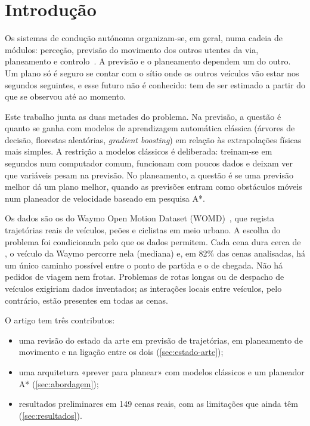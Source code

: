 \section{Introdução}
\label{sec:introducao}

Os sistemas de condução autónoma organizam-se, em geral, numa cadeia de
módulos: perceção, previsão do movimento dos outros utentes da via,
planeamento e controlo~\cite{paden2016survey,schwarting2018planning}. A
previsão e o planeamento dependem um do outro. Um plano só é seguro se
contar com o sítio onde os outros veículos vão estar nos segundos
seguintes, e esse futuro não é conhecido: tem de ser estimado a partir do
que se observou até ao momento.

Este trabalho junta as duas metades do problema. Na previsão, a questão é
quanto se ganha com modelos de aprendizagem automática clássica (árvores
de decisão, florestas aleatórias, \emph{gradient boosting}) em relação às
extrapolações físicas mais simples. A restrição a modelos clássicos é
deliberada: treinam-se em segundos num computador comum, funcionam com
poucos dados e deixam ver que variáveis pesam na previsão. No
planeamento, a questão é se uma previsão melhor dá um plano melhor,
quando as previsões entram como obstáculos móveis num planeador de
velocidade baseado em pesquisa A*.

Os dados são os do Waymo Open Motion Dataset
(WOMD)~\cite{ettinger2021large}, que regista trajetórias reais de
veículos, peões e ciclistas em meio urbano. A escolha do problema foi
condicionada pelo que os dados permitem. Cada cena dura cerca de
, o veículo da Waymo percorre nela  (mediana) e, em
82\% das cenas analisadas, há um único caminho possível entre o ponto de
partida e o de chegada. Não há pedidos de viagem nem frotas. Problemas de
rotas longas ou de despacho de veículos exigiriam dados inventados; as
interações locais entre veículos, pelo contrário, estão presentes em
todas as cenas.

O artigo tem três contributos:
\begin{itemize}
  \item uma revisão do estado da arte em previsão de trajetórias, em
    planeamento de movimento e na ligação entre os dois
    (\cref{sec:estado-arte});
  \item uma arquitetura «prever para planear» com modelos clássicos e um
    planeador A* (\cref{sec:abordagem});
  \item resultados preliminares em 149 cenas reais, com as limitações que
    ainda têm (\cref{sec:resultados}).
\end{itemize}
